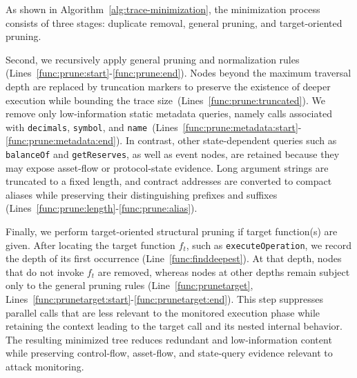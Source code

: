 As shown in Algorithm~\ref{alg:trace-minimization}, the minimization process consists of three stages: duplicate removal, general pruning, and target-oriented pruning.

Second, we recursively apply general pruning and normalization rules (Lines~\ref{func:prune:start}-\ref{func:prune:end}). Nodes beyond the maximum traversal depth are replaced by truncation markers to preserve the existence of deeper execution while bounding the trace size~(Lines~\ref{func:prune:truncated}). We remove only low-information static metadata queries, namely calls associated with \texttt{decimals}, \texttt{symbol}, and \texttt{name}~(Lines~\ref{func:prune:metadata:start}-\ref{func:prune:metadata:end}). In contrast, other state-dependent queries such as \texttt{balanceOf} and \texttt{getReserves}, as well as event nodes, are retained because they may expose asset-flow or protocol-state evidence. 
Long argument strings are truncated to a fixed length, and contract addresses are converted to compact aliases while preserving their distinguishing prefixes and suffixes (Lines~\ref{func:prune:length}-\ref{func:prune:alias}).

Finally, we perform target-oriented structural pruning if target function(s) are given. After locating the target function \(f_t\), such as \texttt{executeOperation}, we record the depth of its first occurrence (Line~\ref{func:finddeepest}). At that depth, nodes that do not invoke \(f_t\) are removed, whereas nodes at other depths remain subject only to the general pruning rules (Line~\ref{func:prunetarget}, Lines~\ref{func:prunetarget:start}-\ref{func:prunetarget:end}). This step suppresses parallel calls that are less relevant to the monitored execution phase while retaining the context leading to the target call and its nested internal behavior. The resulting minimized tree reduces redundant and low-information content while preserving control-flow, asset-flow, and state-query evidence relevant to attack monitoring.


